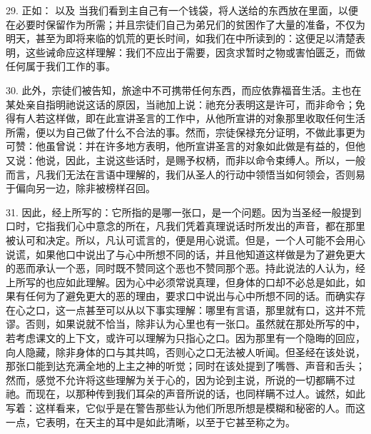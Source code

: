 29. 正如： 以及  当我们看到主自己有一个钱袋，将人送给的东西放在里面，以便在必要时保留作为所需；并且宗徒们自己为弟兄们的贫困作了大量的准备，不仅为明天，甚至为即将来临的饥荒的更长时间，如我们在中所读到的：这便足以清楚表明，这些诫命应这样理解：我们不应出于需要，因贪求暂时之物或害怕匮乏，而做任何属于我们工作的事。\par

30. 此外，宗徒们被告知，旅途中不可携带任何东西，而应依靠福音生活。主也在某处亲自指明祂说这话的原因，当祂加上说：祂充分表明这是许可，而非命令；免得有人若这样做，即在此宣讲圣言的工作中，从他所宣讲的对象那里收取任何生活所需，便以为自己做了什么不合法的事。然而，宗徒保禄充分证明，不做此事更为可赞：他虽曾说：并在许多地方表明，他所宣讲圣言的对象如此做是有益的，但他又说：他说，因此，主说这些话时，是赐予权柄，而非以命令束缚人。所以，一般而言，凡我们无法在言语中理解的，我们从圣人的行动中领悟当如何领会，否则易于偏向另一边，除非被榜样召回。\par

31. 因此，经上所写的：它所指的是哪一张口，是一个问题。因为当圣经一般提到口时，它指我们心中意念的所在，凡我们凭着真理说话时所发出的声音，都在那里被认可和决定。所以，凡认可谎言的，便是用心说谎。但是，一个人可能不会用心说谎，如果他口中说出了与心中所想不同的话，并且他知道这样做是为了避免更大的恶而承认一个恶，同时既不赞同这个恶也不赞同那个恶。持此说法的人认为，经上所写的也应如此理解。因为心中必须常说真理，但身体的口却不必总是如此，如果有任何为了避免更大的恶的理由，要求口中说出与心中所想不同的话。而确实存在心之口，这一点甚至可以从以下事实理解：哪里有言语，那里就有口，这并不荒谬。否则，如果说就不恰当，除非认为心里也有一张口。虽然就在那处所写的中，若考虑课文的上下文，或许可以理解为只指心之口。因为那里有一个隐晦的回应，向人隐藏，除非身体的口与其共鸣，否则心之口无法被人听闻。但圣经在该处说，那张口能到达充满全地的上主之神的听觉；同时在该处提到了嘴唇、声音和舌头；然而，感觉不允许将这些理解为关于心的，因为论到主说，所说的一切都瞒不过祂。而现在，以那种传到我们耳朵的声音所说的话，也同样瞒不过人。诚然，如此写着：这样看来，它似乎是在警告那些认为他们所思所想是模糊和秘密的人。而这一点，它表明，在天主的耳中是如此清晰，以至于它甚至称之为。\par

